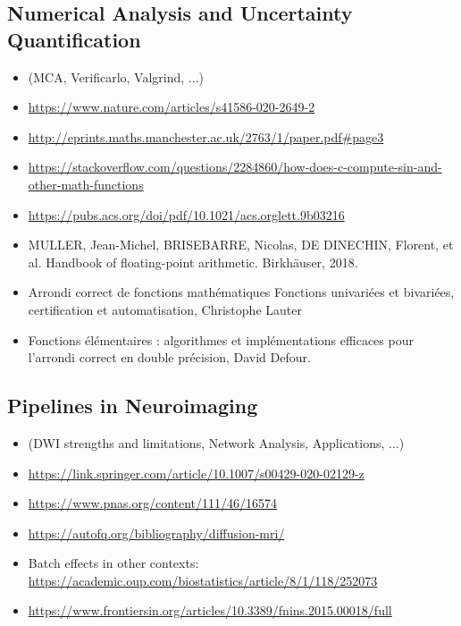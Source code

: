 \subsection{Numerical Analysis and Uncertainty Quantification}
\begin{itemize}
\item (MCA, Verificarlo, Valgrind, ...)
\item \url{https://www.nature.com/articles/s41586-020-2649-2}
\item \url{http://eprints.maths.manchester.ac.uk/2763/1/paper.pdf#page3}
\item \url{https://stackoverflow.com/questions/2284860/how-does-c-compute-sin-and-other-math-functions}
\item \url{https://pubs.acs.org/doi/pdf/10.1021/acs.orglett.9b03216}
\item MULLER, Jean-Michel, BRISEBARRE, Nicolas, DE DINECHIN, Florent, et al. Handbook of floating-point arithmetic. Birkhäuser, 2018.
\item Arrondi correct de fonctions mathématiques Fonctions univariées et bivariées, certification et automatisation, Christophe Lauter
\item Fonctions élémentaires : algorithmes et implémentations efficaces pour l'arrondi correct en double précision, David Defour.
\end{itemize}

\subsection{Pipelines in Neuroimaging}
\begin{itemize}
\item (DWI strengths and limitations, Network Analysis, Applications, ...)
\item \url{https://link.springer.com/article/10.1007/s00429-020-02129-z}
\item \url{https://www.pnas.org/content/111/46/16574}
\item \url{https://autofq.org/bibliography/diffusion-mri/}
\item Batch effects in other contexts: \url{https://academic.oup.com/biostatistics/article/8/1/118/252073}
\item \url{https://www.frontiersin.org/articles/10.3389/fnins.2015.00018/full}
\end{itemize}

